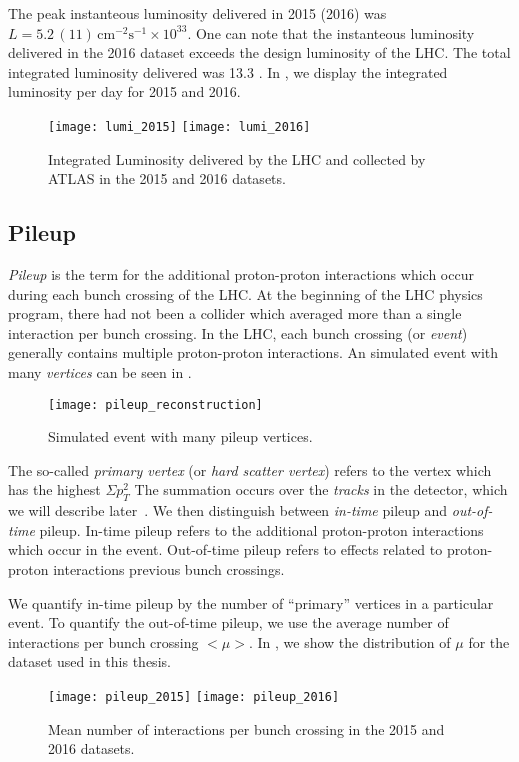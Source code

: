 The peak instanteous luminosity delivered in 2015 (2016) was $L = 5.2 \, (11) \, \text{cm}^{-2} \text{s}^{-1} \times 10^{33} $.
One can note that the instanteous luminosity delivered in the 2016 dataset exceeds the design luminosity of the LHC.
The total integrated luminosity delivered was 13.3 \ifb.
In , we display the integrated luminosity per day for 2015 and 2016.
\begin{figure}
\caption{Integrated Luminosity delivered by the LHC and collected by ATLAS in the 2015 and 2016 datasets.}\label{fig:lumi}
\texttt{[image: lumi\_2015]}
\texttt{[image: lumi\_2016]}
\end{figure}

\subsection{Pileup}

\textit{Pileup} is the term for the additional proton-proton interactions which occur during each bunch crossing of the LHC.
At the beginning of the LHC physics program, there had not been a collider which averaged more than a single interaction per bunch crossing.
In the LHC, each bunch crossing (or \textit{event})  generally contains multiple proton-proton interactions.
An simulated event with many \textit{vertices} can be seen in .
\begin{figure}
\caption{Simulated event with many pileup vertices.}\label{fig:pileup_reconstruction}
\texttt{[image: pileup\_reconstruction]}
\end{figure}
The so-called \textit{primary vertex} (or \textit{hard scatter vertex}) refers to the vertex which has the highest $\Sigma p_T^2$
The summation occurs over the \textit{tracks} in the detector, which we will describe later~\cite{ATL-INDET-PUB-2009-001}.
We then distinguish between \textit{in-time} pileup and \textit{out-of-time} pileup.
In-time pileup refers to the additional proton-proton interactions which occur in the event.
Out-of-time pileup refers to effects related to proton-proton interactions previous bunch crossings.

We quantify in-time pileup by the number of ``primary''\footnotemark \xspace vertices in a particular event.
To quantify the out-of-time pileup, we use the average number of interactions per bunch crossing $<\mu>$.
In , we show the distribution of $\mu$ for the dataset used in this thesis.
\begin{figure}
\caption{Mean number of interactions per bunch crossing in the 2015 and 2016 datasets.}\label{fig:pileup}
\texttt{[image: pileup\_2015]}
\texttt{[image: pileup\_2016]}
\end{figure}
